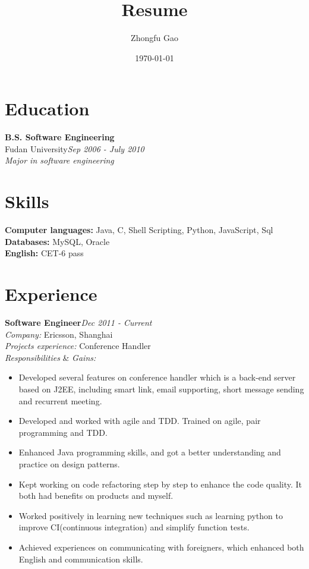 \documentclass[line, margin, 11pt]{res}
\author{Zhongfu Gao}
\title{Resume}
\date{\today}
\begin{document}
\renewcommand{\namefont}{ \LARGE \bf } %
\address{{\bf Email: }joshuafufu@gmail.com}
\address{{\bf Mobile: }(+86)15921928229}

\begin{resume}

\section{Education}
{\bf B.S. Software Engineering}\\
Fudan University\hfill {\it Sep 2006 - July 2010}\\
{\sl Major in software engineering}

\section{Skills}
{\bf Computer languages:} Java, C, Shell Scripting, Python, JavaScript, Sql \\
{\bf Databases:} MySQL, Oracle\\
{\bf English:} CET-6 pass


\section{Experience}

{\bf Software Engineer}\hfill {\it Dec 2011 - Current}\\
{\sl Company:} Ericsson, Shanghai\\
{\sl Projects experience:} Conference Handler\\
{\sl Responsibilities} \& {\sl Gains:}
\begin{itemize}
\item Developed several features on conference handler which is a back-end server based on J2EE, including smart link, email supporting, short message sending and recurrent meeting.
\item Developed and worked with agile and TDD. Trained on agile, pair programming and TDD.
\item Enhanced Java programming skills, and got a better understanding and practice on design patterns.
\item Kept working on code refactoring step by step to enhance the code quality. It both had benefits on products and myself.
\item Worked positively in learning new techniques such as learning python to improve CI(continuous integration) and simplify function tests.
\item Achieved experiences on communicating with foreigners, which enhanced both English and communication skills.
\end{itemize}


\end{resume}
\end{document}
